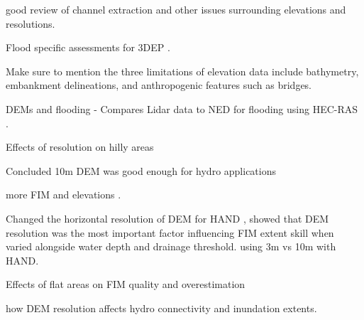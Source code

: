\documentclass[preprint,review,12pt]{dependencies/elsarticle}
\begin{document}
\citep{tarolli2014high} good review of channel extraction and other issues surrounding elevations and resolutions. 

Flood specific assessments for 3DEP \citep{carswell20183d,bales2009sources,gesch2018best,podhoranyi2015inaccuracy,lamichhane2018effect,tsubaki2013uncertainty,dobbs2010evaluation,arrighi2019effects,zazo2015analysis,bhuyian2018accounting,gesch2012elevation,witt2015evaluation}.

Make sure to mention the three limitations of elevation data include bathymetry, embankment delineations, and anthropogenic features such as bridges.

DEMs and flooding \citep{casas2006topographic,thomas2016quantifying,savage2016does,passalacqua2010geometric,passalacqua2012automatic,munoth2019effects}
 - Compares Lidar data to NED for flooding using HEC-RAS \citep{wang2005comparison}.

Effects of resolution on hilly areas \citep{dai2019effects}

Concluded 10m DEM was good enough for hydro applications \citep{zhang1994digital}

more FIM and elevations \citep{werner2001impact,omer2003impact,bates2003optimal,tate2002creating,colby2000modeling}.

Changed the horizontal resolution of DEM for HAND \citep{li2022accounting}, showed that DEM resolution was the most important factor influencing FIM extent skill when varied alongside water depth and drainage threshold.
\citep{garousi2019terrain} using 3m vs 10m with HAND.

Effects of flat areas on FIM quality and overestimation \citep{garousi2019terrain,godbout2019error,jafarzadegan2017based,papaioannou2017probabilistic}

\citep{lopez2018influence} how DEM resolution affects hydro connectivity and inundation extents.
\end{document}
